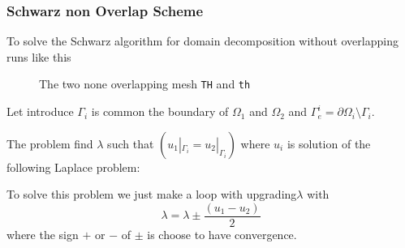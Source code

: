 \documentclass[a4paper,twoside,12pt]{book}
\def\p{\partial}
\begin{document}
\subsubsection{Schwarz non Overlap Scheme}

To solve
the Schwarz algorithm for domain decomposition without overlapping  runs like this

\begin{figure}[hbt]
\caption{ The two none overlapping mesh \texttt{TH} and \texttt{th}  }
\end{figure}

Let introduce  $\Gamma_i$ is  common the boundary of $\Omega_1$ and
$\Omega_2$ and    $\Gamma_e^i= \p \Omega_i \setminus \Gamma_i$.

The problem  find  $\lambda$ such that $ (u_1|_{\Gamma_i}=u_2|_{\Gamma_i}) $
where  $u_i$ is solution of the following Laplace problem:

To solve this problem we just make a loop
with upgrading$\lambda$ with
$$\lambda = \lambda {\pm} \frac{(u_1-u_2)}{2}$$
where the sign $+$ or $-$ of ${\pm}$ is choose to have convergence.
\end{document}
